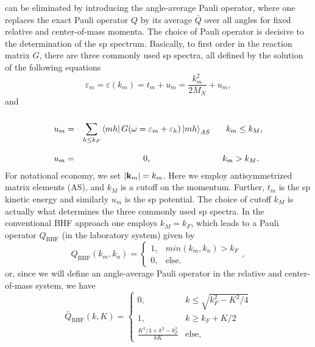 can be eliminated by introducing the angle-average
Pauli operator, where one replaces the exact Pauli operator $Q$
by its average $\bar{Q}$ over all angles for fixed relative and center-of-mass
momenta.
The choice of Pauli operator is decisive to the determination of the
sp
spectrum. Basically, to first order in the reaction matrix $G$,
there are three commonly used sp spectra, all
defined by the solution of the following equations
\begin{equation}
   \varepsilon_{m} = \varepsilon (k_{m})
   = t_{m} + u_{m}=\frac{k_{m}^2}{2M_N}
   +u_{m},
   \label{eq:spnrel}
\end{equation}
and
\begin{equation}
   \begin{array}{ccc}\\
   u_{m} =& {\displaystyle \sum_{h \leq k_F}}
   \left\langle m h \right| G(\omega = \varepsilon_{m} + \varepsilon_h )
   \left| m h \right\rangle_{AS} & \hspace{3mm}k_m \leq k_M,  \\ \\
   u_m=&0,& k_m > k_M. \end{array}
   \label{eq:selfcon}
\end{equation}
For notational economy, we set $|{\bf k}_m|=k_m$.
Here we employ antisymmetrized matrix elements (AS), and $k_M$ is a cutoff
on the momentum. Further, $t_m$ is the sp kinetic
energy and similarly $u_m$
is the
sp potential.
The choice of cutoff $k_M$ is actually what determines the three
commonly used sp spectra.
In the conventional BHF approach one employs $k_M = k_F$,
which leads
to a Pauli operator $Q_{\mathrm{BHF}}$ (in the laboratory system) given by
\begin{equation}
   Q_{\mathrm{BHF}}(k_m , k_n ) =
    \left\{\begin{array}{cc}1,&min(k_m ,k_n ) > k_F\\
    0,&\mathrm{else}.\end{array}\right.
    \label{eq:bhf},
\end{equation}
or, since we will define an
angle-average Pauli operator in the relative and center-of-mass
system, we have
\begin{equation}
     \bar{Q}_{\mathrm{BHF}}(k,K)=\left\{\begin{array}{cc}
         0,&k\leq \sqrt{k_{F}^{2}-K^2/4}\\
         1,&k\geq k_F + K/2\\
	\frac{K^2/4+k^2 -k_{F}^2}{kK}&\mathrm{else},\end{array}\right.
    \label{eq:qbhf}
\end{equation}
